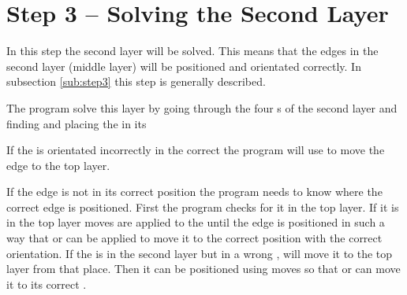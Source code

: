 \section{Step 3 -- Solving the Second Layer}
In this step the second layer will be solved. 
This means that the edges in the second layer (middle layer) will be positioned and orientated correctly. 
In subsection \ref{sub:step3} this step is generally described. 

The program solve this layer by going through the four \cubicle{}s of the second layer and finding and placing the \cpiece{} in its \cubicle{}

If the \cpiece{} is orientated incorrectly in the correct \cubicle{} the program will use   to move the edge \cpiece{} to the top layer.

If the edge \cpiece{} is not in its correct position the program needs to know where the correct edge \cpiece{} is positioned. First the program checks for it in the top layer. 
If it is in the top layer  moves are applied to the \rubik{} until the edge \cpiece{} is positioned in such a way that  or  can be applied to move it to the correct position with the correct orientation. 
If the \cpiece{} is in the second layer but in a wrong \cubicle{},  will move it to the top layer from that place. 
Then it can be positioned using  moves so that  or  can move it to its correct \cubicle{}.